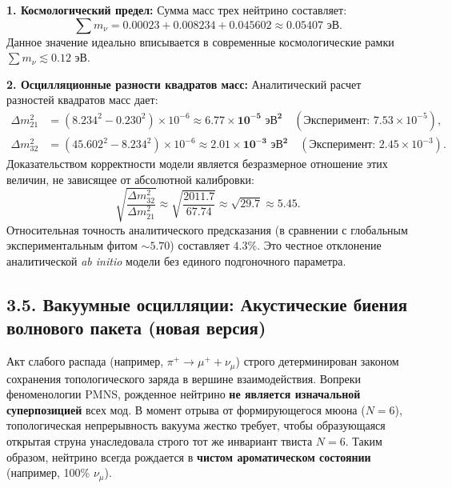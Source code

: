 \documentclass[11pt,a4paper]{article}
\begin{document}
	\textbf{1. Космологический предел:}
	Сумма масс трех нейтрино составляет:
	\begin{equation}
		\sum m_\nu = 0.00023 + 0.008234 + 0.045602 \approx \mathbf{0.05407 \text{ эВ}}.
	\end{equation}
	Данное значение идеально вписывается в современные космологические рамки $\sum m_\nu \lesssim 0.12$ эВ.
	
	\textbf{2. Осцилляционные разности квадратов масс:}
	Аналитический расчет разностей квадратов масс дает:
	\begin{align}
		\Delta m^2_{21} &= (8.234^2 - 0.230^2) \times 10^{-6} \approx \mathbf{6.77 \times 10^{-5} \text{ эВ}^2} \quad (\text{Эксперимент: } 7.53 \times 10^{-5}), \\
		\Delta m^2_{32} &= (45.602^2 - 8.234^2) \times 10^{-6} \approx \mathbf{2.01 \times 10^{-3} \text{ эВ}^2} \quad (\text{Эксперимент: } 2.45 \times 10^{-3}).
	\end{align}
	Доказательством корректности модели является безразмерное отношение этих величин, не зависящее от абсолютной калибровки:
	\begin{equation}
		\sqrt{\frac{\Delta m^2_{32}}{\Delta m^2_{21}}} \approx \sqrt{\frac{2011.7}{67.74}} \approx \sqrt{29.7} \approx \mathbf{5.45}.
	\end{equation}
	Относительная точность аналитического предсказания (в сравнении с глобальным экспериментальным фитом $\sim 5.70$) составляет $4.3\%$. Это честное отклонение аналитической \textit{ab initio} модели без единого подгоночного параметра.
	
	\subsection{3.5. Вакуумные осцилляции: Акустические биения волнового пакета (новая версия)}
	Акт слабого распада (например, $\pi^+ \to \mu^+ + \nu_\mu$) строго детерминирован законом сохранения топологического заряда в вершине взаимодействия. Вопреки феноменологии PMNS, рожденное нейтрино \textbf{не является изначальной суперпозицией} всех мод. 
	В момент отрыва от формирующегося мюона ($N=6$), топологическая непрерывность вакуума жестко требует, чтобы образующаяся открытая струна унаследовала строго тот же инвариант твиста $N=6$. Таким образом, нейтрино всегда рождается в \textbf{чистом ароматическом состоянии} (например, 100\% $\nu_\mu$).
	
\end{document}
